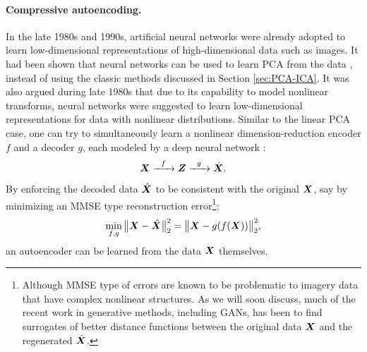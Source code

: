\documentclass[../../book-main.tex]{subfiles}
\begin{document}
\paragraph{Compressive autoencoding.}
In the late 1980s and 1990s, artificial neural networks were already adopted to learn low-dimensional representations of high-dimensional data such as images. It had been shown that neural networks can be used to learn PCA from the data \cite{Oja1982SimplifiedNM,Baldi89}, instead of using the classic methods discussed in Section \ref{sec:PCA-ICA}. It was also argued during late 1980s that due to its capability to model nonlinear transforms, neural networks were suggested to learn low-dimensional representations for data with nonlinear distributions. Similar to the linear PCA case, one can try to simultaneously learn a nonlinear dimension-reduction encoder $f$ and a decoder $g$, each modeled by a deep neural network  \cite{Rumelhart1986,Kramer1991NonlinearPC}:
\begin{equation}
    \bm{X}   \xrightarrow{\hspace{2mm} f \hspace{2mm}} \bm{Z}  \xrightarrow{\hspace{2mm} g \hspace{2mm}} \hat {\bm{X}}.
       \label{eqn:auto-encoding-deep-networks}
\end{equation}
By enforcing the decoded data $\hat {\bm{X}}$ to be consistent with the original $\bm{X}$, say by minimizing an MMSE type reconstruction error\footnote{Although MMSE type of errors are known to be problematic to imagery data that have complex nonlinear structures. As we will soon discuss, much of the recent work in generative methods, including GANs, has been to find surrogates of better distance functions between the original data $\bm{X}$ and the regenerated $\hat {\bm{X}}$.}:
\begin{equation}
    \min_{f,g} \big\|\bm{X} - \hat {\bm{X}}\big\|_2^2 = \big\|\bm{X} - g(f( \bm{X}))\big\|_2^2,
\end{equation}
an autoencoder can be learned from the data $\bm{X}$ themselves. 
\end{document}
